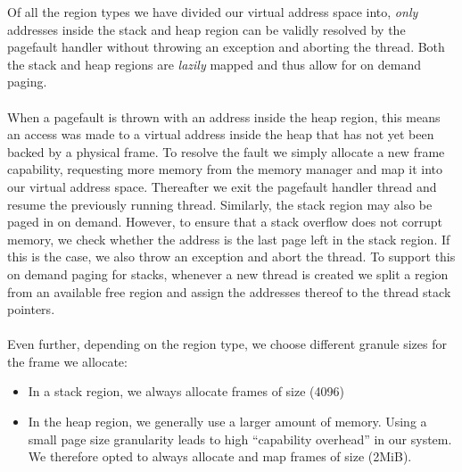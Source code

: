 Of all the region types we have divided our virtual address space into, \textit{only} addresses inside the stack and heap region can be validly resolved by the pagefault handler without throwing an exception and aborting the thread. Both the stack and heap regions are \textit{lazily} mapped and thus allow for on demand paging. 
\paragraph{}
When a pagefault is thrown with an address inside the heap region, this means an access was made to a virtual address inside the heap that has not yet been backed by a physical frame. To resolve the fault we simply allocate a new frame capability, requesting more memory from the memory manager and map it into our virtual address space. Thereafter we exit the pagefault handler thread and resume the previously running thread. Similarly, the stack region may also be paged in on demand. However, to ensure that a stack overflow does not corrupt memory, we check whether the address is the last page left in the stack region. If this is the case, we also throw an exception and abort the thread. To support this on demand paging for stacks, whenever a new thread is created we split  a region from an available free region and assign the addresses thereof to the thread stack pointers.

\paragraph{}
Even further, depending on the region type, we choose different granule sizes for the frame we allocate:
\begin{itemize}
    \item In a stack region, we always allocate frames of size  (4096)
    \item In the heap region, we generally use a larger amount of memory. Using a small
    page size granularity leads to high ``capability overhead'' in our system. We therefore opted to
    always allocate and map frames of size  (2MiB).
\end{itemize}


